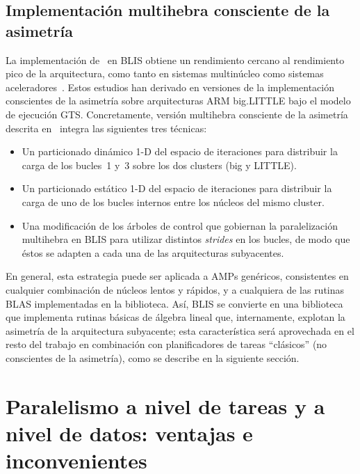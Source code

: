 

\subsection{Implementación multihebra consciente de la asimetría}

La implementación de \gemm\ en BLIS obtiene un rendimiento cercano al rendimiento pico de la arquitectura,
como tanto en sistemas multinúcleo como sistemas aceleradores~\cite{BLIS2,BLIS3}. 
Estos estudios han derivado en versiones de la implementación conscientes de la asimetría sobre arquitecturas ARM big.LITTLE
bajo el modelo de ejecución GTS. Concretamente, versión multihebra consciente de la asimetría descrita en~\cite{asymBLIS} 
integra las siguientes tres técnicas:
\begin{itemize}
\item Un particionado dinámico 1-D del espacio de iteraciones para distribuir la carga de los bucles~1 y~3 sobre los dos
	clusters (big y LITTLE).
\item Un particionado estático 1-D del espacio de iteraciones para distribuir la carga de uno de los  bucles internos entre los núcleos
	del mismo cluster.
\item Una modificación de los árboles de control que gobiernan la paralelización multihebra en BLIS para utilizar distintos {\em strides} en 
	los bucles, de modo que éstos se adapten a cada una de las arquitecturas subyacentes.
\end{itemize}

En general, esta estrategia puede ser aplicada a AMPs genéricos, consistentes en cualquier combinación de núcleos lentos y rápidos, y a cualquiera
de las rutinas BLAS implementadas en la biblioteca. Así, BLIS se convierte en una biblioteca que implementa rutinas básicas de álgebra lineal que,
internamente, explotan la asimetría de la arquitectura subyacente; esta característica será aprovechada en el resto del trabajo en combinación
con planificadores de tareas ``clásicos'' (no conscientes de la asimetría), como se describe en la siguiente sección.


\section{Paralelismo a nivel de tareas y a nivel de datos: ventajas e inconvenientes}
\label{sec:comparativa}

